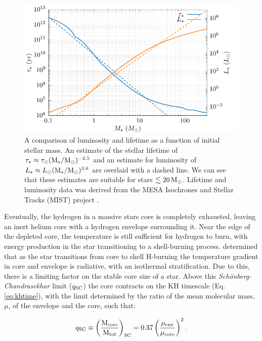 \begin{figure}[ht]
  \centering
  \includegraphics{assets/lifespan/lifespan.pdf}
  \caption[Luminosity and lifetime as a function of stellar mass]{A comparison of luminosity and lifetime as a function of initial stellar mass. An estimate of the stellar lifetime of $\tau_\star \approx \tau_{\odot} (\text{M}_\star/\text{M}_{\odot})^{-2.5}$ and an estimate for luminosity of $L_\star \approx L _{\odot} (\text{M}_\star/\text{M}_{\odot})^{3.6}$ are overlaid with a dashed line. We can see that these estimates are suitable for stars $\lesssim 20 \, \text{M}_{\odot}$. Lifetime and luminosity data was derived from the MESA Isochrones and Stellar Tracks (MIST) project \parencite{choiMesaIsochronesStellar2016,dotterMESAIsochronesStellar2016,paxtonModulesExperimentsStellar2011}.}
  \label{fig:mist-lifespan}
\end{figure}

Eventually, the hydrogen in a massive stars core is completely exhausted, leaving an inert helium core with a hydrogen envelope surrounding it.
Near the edge of the depleted core, the temperature is still sufficient for hydrogen to burn, with energy production in the star transitioning to a shell-burning process.
\textcite{schonbergEvolutionMainSequenceStars1942} determined that as the star transitions from core to shell H-burning the temperature gradient in core and envelope is radiative, with an isothermal stratification.
Due to this, there is a limiting factor on the stable core size of a star.
Above this \emph{Sch{\"o}nberg-Chandrasekhar} limit ($q_\text{SC}$) the core contracts on the KH timescale (Eq. \ref{eq:khtime}), with the limit determined by the ratio of the mean molecular mass, $\mu$, of the envelope and the core, such that:

\begin{equation}
  q_\text{SC} \equiv \left(\frac{\text{M}_\text{core}}{\text{M}_\text{tot}}\right)_\text{SC} = 0.37 \left(\frac{\mu_\text{env}}{\mu_\text{core}}\right)^2 .
\end{equation}


